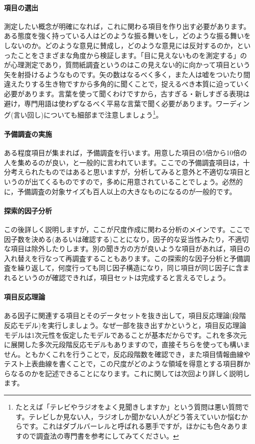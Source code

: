 \documentclass{ltjsbook}
\begin{document}
\paragraph{項目の選出}測定したい概念が明確になれば，これに関わる項目を作り出す必要があります。ある態度を強く持っている人はどのような振る舞いをし，どのような振る舞いをしないのか。どのような意見に賛成し，どのような意見には反対するのか，といったことをさまざまな角度から検証します。「目に見えないものを測定する」のが心理測定であり，質問紙調査というのはこの見えない的に向かって項目という矢を射掛けるようなものです。矢の数はなるべく多く，また人は嘘をついたり間違えたりする生き物ですから多角的に聞くことで，捉えるべき本質に迫っていく必要があります。言葉を使って聞くわけですから，古すぎる・新しすぎる表現は避け，専門用語は使わずなるべく平易な言葉で聞く必要があります。ワーディング(言い回し)についても細部まで注意しましょう\footnote{たとえば「テレビやラジオをよく見聞きしますか」という質問は悪い質問です。テレビしか見ない人，ラジオしか聞かない人がどう答えていいか悩むからです。これはダブルバーレルと呼ばれる悪手ですが，ほかにも色々ありますので調査法の専門書を参考にしてみてください。}。

\paragraph{予備調査の実施}ある程度項目が集まれば，予備調査を行います。用意した項目の5倍から10倍の人を集めるのが良い，と一般的に言われています\textcite{kosugi2016a}。ここでの予備調査項目は，十分考えられたものではあると思いますが，分析してみると意外と不適切な項目というのが出てくるものですので，多めに用意されていることでしょう。必然的に，予備調査の対象サイズも百人以上の大きなものになるのが一般的です。

\paragraph{探索的因子分析}この後詳しく説明しますが，ここが尺度作成に関わる分析のメインです。ここで因子数を決める(あるいは確認する)ことになり，因子的な妥当性みたり，不適切な項目は除外したりします。別の聞き方の方が良いような項目があれば，項目の入れ替えを行なって再調査することもあります。この探索的な因子分析と予備調査を繰り返して，何度行っても同じ因子構造になり，同じ項目が同じ因子に含まれるというのが確認できれば，項目セットは完成すると言えるでしょう。

\paragraph{項目反応理論}ある因子に関連する項目とそのデータセットを抜き出して，項目反応理論(段階反応モデル)を実行しましょう。なぜ一部を抜き出すかというと，項目反応理論モデルは1次元性を仮定したモデルであることが基本だからです。これを多次元に展開した多次元段階反応モデルもありますので，直接そちらを使っても構いません。ともかくこれを行うことで，反応段階数を確認でき，また項目情報曲線やテスト上表曲線を書くことで，この尺度がどのような領域を得意とする項目群からなるのかを記述できることになります。これに関しては次回より詳しく説明します。
\end{document}
